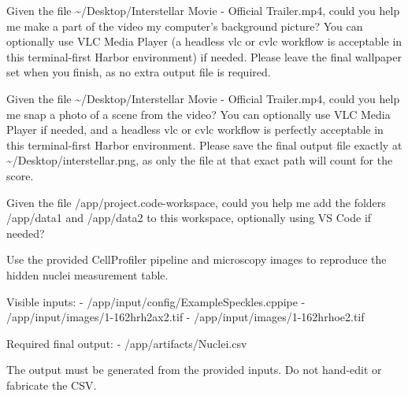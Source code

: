 \begin{instructionbox}
Given the file \textasciigrave{}\textasciitilde{}/Desktop/Interstellar Movie - Official Trailer.mp4\textasciigrave{}, could you help me make a part of the video my computer's background picture? You can optionally use VLC Media Player (a headless \textasciigrave{}vlc\textasciigrave{} or \textasciigrave{}cvlc\textasciigrave{} workflow is acceptable in this terminal-first Harbor environment) if needed. Please leave the final wallpaper set when you finish, as no extra output file is required.
\end{instructionbox}

\begin{instructionbox}
Given the file \textasciigrave{}\textasciitilde{}/Desktop/Interstellar Movie - Official Trailer.mp4\textasciigrave{}, could you help me snap a photo of a scene from the video? You can optionally use VLC Media Player if needed, and a headless \textasciigrave{}vlc\textasciigrave{} or \textasciigrave{}cvlc\textasciigrave{} workflow is perfectly acceptable in this terminal-first Harbor environment. Please save the final output file exactly at \textasciigrave{}\textasciitilde{}/Desktop/interstellar.png\textasciigrave{}, as only the file at that exact path will count for the score.
\end{instructionbox}

\begin{instructionbox}
Given the file \textasciigrave{}/app/project.code-workspace\textasciigrave{}, could you help me add the folders \textasciigrave{}/app/data1\textasciigrave{} and \textasciigrave{}/app/data2\textasciigrave{} to this workspace, optionally using VS Code if needed?
\end{instructionbox}

\begin{instructionbox}
Use the provided CellProfiler pipeline and microscopy images to reproduce the hidden nuclei measurement table.

Visible inputs:
- \textasciigrave{}/app/input/config/ExampleSpeckles.cppipe\textasciigrave{}
- \textasciigrave{}/app/input/images/1-162hrh2ax2.tif\textasciigrave{}
- \textasciigrave{}/app/input/images/1-162hrhoe2.tif\textasciigrave{}

Required final output:
- \textasciigrave{}/app/artifacts/Nuclei.csv\textasciigrave{}

The output must be generated from the provided inputs. Do not hand-edit or fabricate the CSV.
\end{instructionbox}

